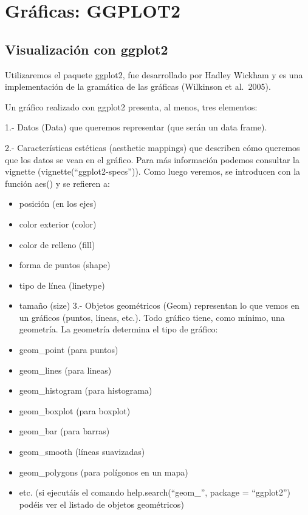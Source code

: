 \documentclass[
]{book}
\begin{document}
\hypertarget{gruxe1ficas-ggplot2}{%
\chapter{Gráficas: GGPLOT2}\label{gruxe1ficas-ggplot2}}

\hypertarget{visualizaciuxf3n-con-ggplot2}{%
\section{Visualización con ggplot2}\label{visualizaciuxf3n-con-ggplot2}}

Utilizaremos el paquete ggplot2, fue desarrollado por Hadley Wickham y es una implementación de la gramática de las gráficas (Wilkinson et al.~2005).

Un gráfico realizado con ggplot2 presenta, al menos, tres elementos:

1.- Datos (Data) que queremos representar (que serán un data frame).

2.- Características estéticas (aesthetic mappings) que describen cómo queremos que los datos se vean en el gráfico. Para más información podemos consultar la vignette (vignette(``ggplot2-specs'')). Como luego veremos, se introducen con la función aes() y se refieren a:

\begin{itemize}
\item
  posición (en los ejes)
\item
  color exterior (color)
\item
  color de relleno (fill)
\item
  forma de puntos (shape)
\item
  tipo de línea (linetype)
\item
  tamaño (size)
  3.- Objetos geométricos (Geom) representan lo que vemos en un gráficos (puntos, líneas, etc.). Todo gráfico tiene, como mínimo, una geometría. La geometría determina el tipo de gráfico:
\item
  geom\_point (para puntos)
\item
  geom\_lines (para lineas)
\item
  geom\_histogram (para histograma)
\item
  geom\_boxplot (para boxplot)
\item
  geom\_bar (para barras)
\item
  geom\_smooth (líneas suavizadas)
\item
  geom\_polygons (para polígonos en un mapa)
\item
  etc. (si ejecutáis el comando help.search(``geom\_'', package = ``ggplot2'') podéis ver el listado de objetos geométricos)
\end{itemize}
\end{document}
